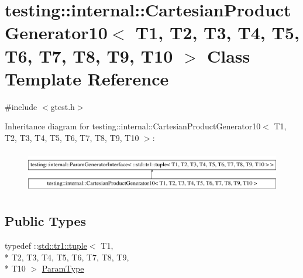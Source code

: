 \hypertarget{classtesting_1_1internal_1_1_cartesian_product_generator10}{\section{testing\-:\-:internal\-:\-:Cartesian\-Product\-Generator10$<$ T1, T2, T3, T4, T5, T6, T7, T8, T9, T10 $>$ Class Template Reference}
\label{classtesting_1_1internal_1_1_cartesian_product_generator10}
}


{\ttfamily \#include $<$gtest.\-h$>$}

Inheritance diagram for testing\-:\-:internal\-:\-:Cartesian\-Product\-Generator10$<$ T1, T2, T3, T4, T5, T6, T7, T8, T9, T10 $>$\-:\begin{figure}[H]
\begin{center}
\leavevmode
\includegraphics[height=1.851240cm]{classtesting_1_1internal_1_1_cartesian_product_generator10}
\end{center}
\end{figure}
\subsection*{Public Types}
\begin{DoxyCompactItemize}
\item 
typedef \-::\hyperlink{classstd_1_1tr1_1_1tuple}{std\-::tr1\-::tuple}$<$ T1, \\*
T2, T3, T4, T5, T6, T7, T8, T9, \\*
T10 $>$ \hyperlink{classtesting_1_1internal_1_1_cartesian_product_generator10_aa483a5910f5dbfb974b43f93853f4b29}{Param\-Type}
\end{DoxyCompactItemize}
